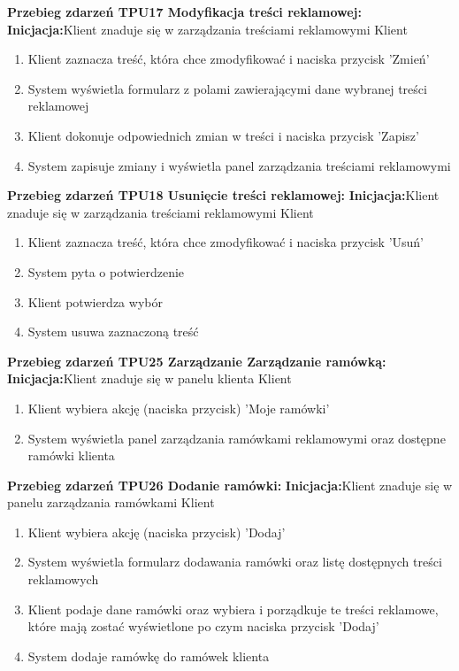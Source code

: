 \documentclass[10pt,a4paper,titlepage]{article} %
\begin{document}
		{\bf Przebieg zdarzeń TPU17 Modyfikacja treści reklamowej:}\newline
		{\bf Inicjacja:}Klient znaduje się w zarządzania treściami reklamowymi
		 Klient
			\begin{enumerate}
			  \item Klient zaznacza treść, która chce zmodyfikować i naciska przycisk
			  'Zmień'
			  \item System wyświetla formularz z polami zawierającymi dane wybranej
			  treści reklamowej
			  \item Klient dokonuje odpowiednich zmian w treści i naciska przycisk
			  'Zapisz'
			  \item System zapisuje zmiany i wyświetla panel zarządzania treściami
			  reklamowymi
			\end{enumerate}
			
		{\bf Przebieg zdarzeń TPU18 Usunięcie treści reklamowej:}\newline
		{\bf Inicjacja:}Klient znaduje się w zarządzania treściami reklamowymi
		 Klient
			\begin{enumerate}
			  \item Klient zaznacza treść, która chce zmodyfikować i naciska przycisk
			  'Usuń'
			  \item System pyta o potwierdzenie
			  \item Klient potwierdza wybór
			  \item System usuwa zaznaczoną treść
			\end{enumerate}
			
		{\bf Przebieg zdarzeń TPU25 Zarządzanie Zarządzanie ramówką:}\newline
		{\bf Inicjacja:}Klient znaduje się w panelu klienta
		 Klient
			\begin{enumerate}
			  \item Klient wybiera akcję (naciska przycisk) 'Moje ramówki'
			  \item System wyświetla panel zarządzania ramówkami reklamowymi oraz
			  dostępne ramówki klienta
			\end{enumerate}
			
		{\bf Przebieg zdarzeń TPU26 Dodanie ramówki:}\newline
		{\bf Inicjacja:}Klient znaduje się w panelu zarządzania ramówkami
		 Klient
			\begin{enumerate}
			  \item Klient wybiera akcję (naciska przycisk) 'Dodaj'
			  \item System wyświetla formularz dodawania ramówki oraz listę dostępnych
			  treści reklamowych
			  \item Klient podaje dane ramówki oraz wybiera i porządkuje te treści
			  reklamowe, które mają zostać wyświetlone po czym naciska przycisk 'Dodaj'
			  \item System dodaje ramówkę do ramówek klienta
			\end{enumerate}
			
\end{document}
